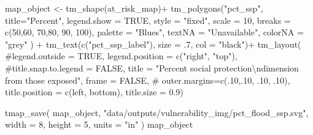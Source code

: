 \documentclass[
  letterpaper,
  DIV=11,
  numbers=noendperiod]{scrartcl}
\newenvironment{Shaded}{}{}
\newcommand{\AttributeTok}[1]{\textcolor[rgb]{0.84,0.23,0.29}{#1}}
\newcommand{\CommentTok}[1]{\textcolor[rgb]{0.42,0.45,0.49}{#1}}
\newcommand{\ConstantTok}[1]{\textcolor[rgb]{0.00,0.36,0.77}{#1}}
\newcommand{\DecValTok}[1]{\textcolor[rgb]{0.00,0.36,0.77}{#1}}
\newcommand{\FloatTok}[1]{\textcolor[rgb]{0.00,0.36,0.77}{#1}}
\newcommand{\FunctionTok}[1]{\textcolor[rgb]{0.44,0.26,0.76}{#1}}
\newcommand{\NormalTok}[1]{\textcolor[rgb]{0.14,0.16,0.18}{#1}}
\newcommand{\OtherTok}[1]{\textcolor[rgb]{0.44,0.26,0.76}{#1}}
\newcommand{\SpecialCharTok}[1]{\textcolor[rgb]{0.00,0.36,0.77}{#1}}
\newcommand{\StringTok}[1]{\textcolor[rgb]{0.01,0.18,0.38}{#1}}
\begin{document}
\begin{Shaded}
\begin{Highlighting}[]
\NormalTok{map\_object }\OtherTok{\textless{}{-}}
\FunctionTok{tm\_shape}\NormalTok{(at\_risk\_map)}\SpecialCharTok{+}
  \FunctionTok{tm\_polygons}\NormalTok{(}\StringTok{"pct\_ssp"}\NormalTok{,}
              \AttributeTok{title=}\StringTok{"Percent"}\NormalTok{, }
              \AttributeTok{legend.show =} \ConstantTok{TRUE}\NormalTok{,}
              \AttributeTok{style =} \StringTok{"fixed"}\NormalTok{,}
              \AttributeTok{scale =} \DecValTok{10}\NormalTok{,}
              \AttributeTok{breaks =} \FunctionTok{c}\NormalTok{(}\DecValTok{50}\NormalTok{,}\DecValTok{60}\NormalTok{, }\DecValTok{70}\NormalTok{,}\DecValTok{80}\NormalTok{, }\DecValTok{90}\NormalTok{, }\DecValTok{100}\NormalTok{),}
              \AttributeTok{palette =} \StringTok{"Blues"}\NormalTok{,}
              \AttributeTok{textNA =} \StringTok{"Unavailable"}\NormalTok{,}
              \AttributeTok{colorNA =} \StringTok{"grey"}
\NormalTok{              ) }\SpecialCharTok{+}
  \FunctionTok{tm\_text}\NormalTok{(}\FunctionTok{c}\NormalTok{(}\StringTok{"pct\_ssp\_label"}\NormalTok{), }\AttributeTok{size =}\NormalTok{ .}\DecValTok{7}\NormalTok{, }\AttributeTok{col =} \StringTok{"black"}\NormalTok{)}\SpecialCharTok{+}
  \FunctionTok{tm\_layout}\NormalTok{(}
    \CommentTok{\#legend.outside = TRUE,}
    \AttributeTok{legend.position =} \FunctionTok{c}\NormalTok{(}\StringTok{"right"}\NormalTok{, }\StringTok{"top"}\NormalTok{),}
    \CommentTok{\#title.snap.to.legend = FALSE,}
    \AttributeTok{title =} 
      \StringTok{"Percent social protection}\SpecialCharTok{\textbackslash{}n}\StringTok{dimension from those exposed"}\NormalTok{,}
    \AttributeTok{frame =} \ConstantTok{FALSE}\NormalTok{,}
\CommentTok{\#            outer.margins=c(.10,.10, .10, .10), }
            \AttributeTok{title.position =} \FunctionTok{c}\NormalTok{(}\StringTok{\textquotesingle{}left\textquotesingle{}}\NormalTok{, }\StringTok{\textquotesingle{}bottom\textquotesingle{}}\NormalTok{),}
            \AttributeTok{title.size =} \FloatTok{0.9}\NormalTok{)}

\FunctionTok{tmap\_save}\NormalTok{(}
\NormalTok{  map\_object,}
  \StringTok{"data/outputs/vulnerability\_img/pct\_flood\_ssp.svg"}\NormalTok{,}
  \AttributeTok{width =} \DecValTok{8}\NormalTok{,}
  \AttributeTok{height =} \DecValTok{5}\NormalTok{,}
  \AttributeTok{units =} \StringTok{"in"}
\NormalTok{)}
\NormalTok{map\_object}
\end{Highlighting}
\end{Shaded}
\end{document}
